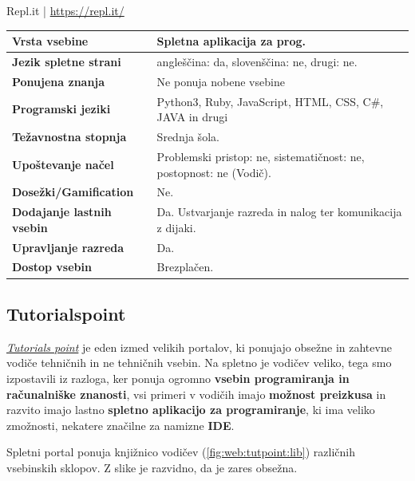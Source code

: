\begin{osebnabox}[label={osebna:replIT}]{Repl.it | \url{https://repl.it/}}
    \begin{tabular}{
  p{} |
  p{}  }
  \textbf{Vrsta vsebine} & Spletna aplikacija za prog. \\
      \hline
  \textbf{Jezik spletne strani} & angleščina: da, slovenščina: ne,
                                  drugi: ne. \\
      \hline
  \textbf{Ponujena znanja} & Ne ponuja nobene vsebine\\
      \hline
 \textbf{Programski jeziki} & Python3,
  Ruby, JavaScript, HTML, CSS, C\#, JAVA in drugi\\
      \hline
  \textbf{Težavnostna stopnja} & Srednja šola.\\
      \hline
   \textbf{Upoštevanje načel} & Problemski pristop: ne,
                                sistematičnost: ne, postopnost: ne (Vodič). \\
      \hline
  \textbf{Dosežki/Gamification} & Ne. \\
      \hline
  \textbf{Dodajanje lastnih vsebin} & Da. Ustvarjanje razreda in nalog
                                      ter komunikacija z dijaki. \\
      \hline
  \textbf{Upravljanje razreda} & Da. \\
      \hline
  \textbf{Dostop vsebin} & Brezplačen. \\

\end{tabular}
\end{osebnabox}

\subsection{Tutorialspoint}
\label{sec:tutorials_point}

\emph{\href{http://www.tutorialspoint.com/}{Tutorials point}}
\cite{web:tutorialspoint} je eden izmed velikih portalov, ki ponujajo
obsežne in zahtevne vodiče tehničnih in ne tehničnih vsebin. Na
spletno je vodičev veliko, tega smo izpostavili iz razloga, ker ponuja
ogromno \textbf{vsebin programiranja in računalniške znanosti}, vsi
primeri v vodičih imajo \textbf{možnost preizkusa} in razvito imajo
lastno \textbf{spletno aplikacijo za programiranje}, ki ima veliko
zmožnosti, nekatere značilne za namizne \textbf{IDE}.

Spletni portal ponuja knjižnico vodičev (\ref{fig:web:tutpoint:lib})
različnih vsebinskih sklopov. Z slike je razvidno, da je zares
obsežna.

